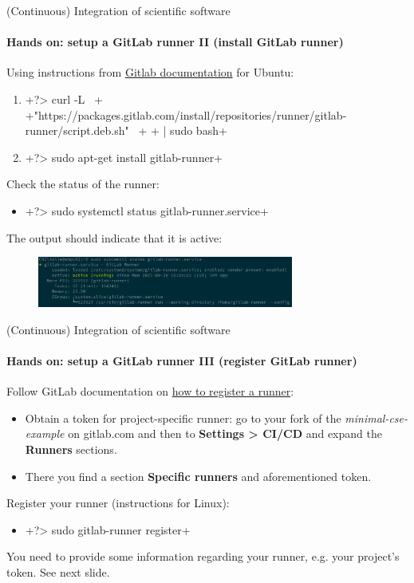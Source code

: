 \begin{frame}{(Continuous) Integration of scientific software}
    \framesubtitle{Hands on: setup a GitLab runner II (install GitLab runner)}
    Using instructions from \href{https://docs.gitlab.com/runner/install/linux-repository.html}{Gitlab documentation} for Ubuntu:
    \begin{enumerate}
        \item {}+?> curl -L \ +
              +"https://packages.gitlab.com/install/repositories/runner/gitlab-runner/script.deb.sh" \ +
              +  | sudo bash+
        \item {}+?> sudo apt-get install gitlab-runner+
    \end{enumerate}
    Check the status of the runner:
    \begin{itemize}
        \item {}+?> sudo systemctl status gitlab-runner.service+
    \end{itemize}
    The output should indicate that it is active:
    \begin{figure}
        \includegraphics[width=0.75\textwidth]{figures/gitlab-runner-active.png}
    \end{figure}
\end{frame}


\begin{frame}{(Continuous) Integration of scientific software}
    \framesubtitle{Hands on: setup a GitLab runner III (register GitLab runner)}
    Follow GitLab documentation on \href{https://docs.gitlab.com/runner/register/index.html}{how to register a runner}:
    \begin{itemize}
        \item Obtain a token for project-specific runner: go to your fork of the \emph{minimal-cse-example} on gitlab.com and then to \textbf{Settings > CI/CD} and expand the \textbf{Runners} sections.
        \item There you find a section \textbf{Specific runners} and aforementioned token.
    \end{itemize}
    Register your runner (instructions for Linux):
    \begin{itemize}
        \item {}+?> sudo gitlab-runner register+
    \end{itemize}
    You need to provide some information regarding your runner, e.g. your project's token. See next slide.
\end{frame}


